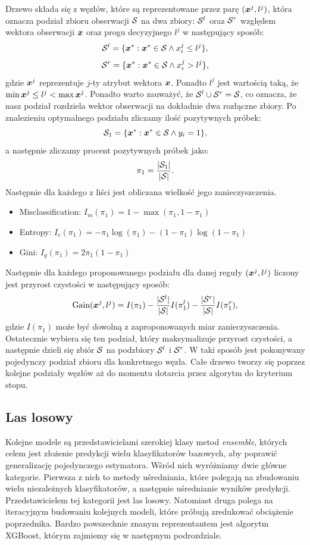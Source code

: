\documentclass{book}
\begin{document}
	Drzewo składa się z węzłów, które są reprezentowane przez parę $(\boldsymbol{x}^j, l^j)$, która oznacza podział zbioru obserwacji $\mathcal{S}$ na dwa zbiory: $\mathcal{S}^{l}$ oraz $\mathcal{S}^{r}$ względem wektora obserwacji $\boldsymbol{x}$ oraz progu decyzyjnego $l^j$ w następujący sposób:
	$$ \mathcal{S}^l = \{ \boldsymbol{x}^* : \boldsymbol{x}^* \in \mathcal{S} \land x^j_i \leq l^j \} \text{,} $$
	$$ \mathcal{S}^r = \{ \boldsymbol{x}^* : \boldsymbol{x}^* \in \mathcal{S} \land x^j_i > l^j \} \text{,} $$
	gdzie $\boldsymbol{x}^j$ reprezentuje $j$-ty atrybut wektora $\boldsymbol{x}$. Ponadto $l^j$ jest wartością taką, że $\min{\boldsymbol{x}^j} \leq l^j < \max{\boldsymbol{x}^j}$. Ponadto warto zauważyć, że $\mathcal{S}^l \cup \mathcal{S}^r = \mathcal{S}$, co oznacza, że nasz podział rozdziela wektor obserwacji na dokładnie dwa rozłączne zbiory.
	Po znalezieniu optymalnego podziału zliczamy ilość pozytywnych próbek:
	$$ \mathcal{S}_1  = \{ \boldsymbol{x}^* : \boldsymbol{x}^* \in \mathcal{S} \land y_i = 1 \} \text{,} $$
	a następnie zliczamy procent pozytywnych próbek jako:
	$$ \pi_1 = \frac{|\mathcal{S}_1|}{|\mathcal{S}|} \text{.}$$
	Następnie dla każdego z liści jest obliczana wielkość jego zanieczyszczenia.
	\begin{itemize}
		\item Misclassification: $I_m(\pi_1) = 1 - \max(\pi_1, 1 - \pi_1)$
		\item Entropy: $I_e(\pi_1) = -\pi_1 \log(\pi_1) - (1 - \pi_1) \log (1 - \pi_1)$
		\item Gini: $I_g(\pi_1) = 2 \pi_1 (1 - \pi_1)$
	\end{itemize}{}
	Następnie dla każdego proponowanego podziału dla danej reguły $(\boldsymbol{x}^j, l^j)$ liczony jest przyrost czystości w następujący sposób:
	$$ \text{Gain}(\boldsymbol{x}^j, l^j) = I(\pi_1) - \frac{|\mathcal{S}^l|}{|\mathcal{S}|} I(\pi_1^l) - \frac{|\mathcal{S}^r|}{|\mathcal{S}|} I(\pi_1^r) \text{,}$$
	gdzie $I(\pi_1)$ może być dowolną z zaproponowanych miar zanieczyszczenia.
	Ostatecznie wybiera się ten podział, który maksymalizuje przyrost czystości, a następnie dzieli się zbiór $\mathcal{S}$ na podzbiory $\mathcal{S}^l$ i $\mathcal{S}^r$.
	W taki sposób jest pokonywany pojedynczy podział zbioru dla konkretnego węzła. Całe drzewo tworzy się poprzez kolejne podziały węzłów aż do momentu dotarcia przez algorytm do kryterium stopu.
	

\subsection{Las losowy}
	Kolejne modele są przedstawicielami szerokiej klasy metod \textit{ensemble}, których celem jest złożenie predykcji wielu klasyfikatorów bazowych, aby poprawić generalizację pojedynczego estymatora. Wśród nich wyróżniamy dwie główne kategorie. Pierwsza z nich to metody uśredniania, które polegają na zbudowaniu wielu niezależnych klasyfikatorów, a następnie uśrednianie wyników predykcji. Przedstawicielem tej kategorii jest las losowy. Natomiast druga polega na iteracyjnym budowaniu kolejnych modeli, które próbują zredukować obciążenie poprzednika. Bardzo powszechnie znanym reprezentantem jest algorytm XGBoost, którym zajmiemy się w następnym podrozdziale.
		
\end{document}
